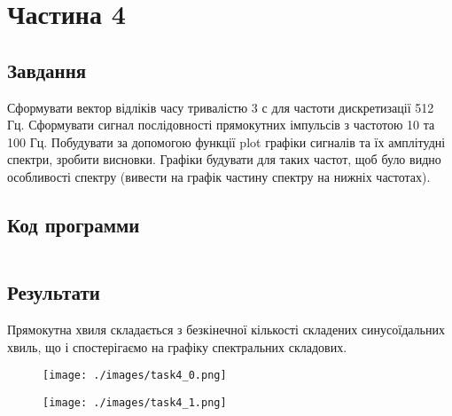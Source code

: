 \section{Частина 4}
\label{sec:task4}

\subsection{Завдання}
\label{subsec:task4_task}

Сформувати вектор відліків часу тривалістю 3 с для частоти
дискретизації 512 Гц. Сформувати сигнал послідовності прямокутних імпульсів
з частотою 10 та 100 Гц. Побудувати за допомогою функції plot графіки
сигналів та їх амплітудні спектри, зробити висновки. Графіки
будувати для таких частот, щоб було видно особливості спектру (вивести на
графік частину спектру на нижніх частотах).

\subsection{Код программи}
\label{subsec:task4_code}
\inputminted{python}{../src/task4.py}

\subsection{Результати}
\label{subsec:task4_results}

Прямокутна хвиля складається з безкінечної кількості
складених синусоїдальних хвиль, що і спостерігаємо
на графіку спектральних складових.

\begin{figure}[!ht]
    \centering
    \texttt{[image: ./images/task4\_0.png]}
\end{figure}

\begin{figure}[!ht]
    \centering
    \texttt{[image: ./images/task4\_1.png]}
\end{figure}
